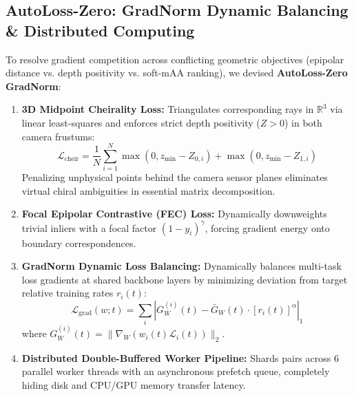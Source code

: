 \documentclass[10pt,twocolumn,letterpaper]{article}
\begin{document}
\subsection{AutoLoss-Zero: GradNorm Dynamic Balancing \& Distributed Computing}
To resolve gradient competition across conflicting geometric objectives (epipolar distance vs. depth positivity vs. soft-mAA ranking), we devised \textbf{AutoLoss-Zero GradNorm}:
\begin{enumerate}
    \item \textbf{3D Midpoint Cheirality Loss:} Triangulates corresponding rays in $\mathbb{R}^3$ via linear least-squares and enforces strict depth positivity ($Z > 0$) in both camera frustums:
    \begin{equation}
        \mathcal{L}_{\text{cheir}} = \frac{1}{N} \sum_{i=1}^N \max(0, z_{\min} - Z_{0, i}) + \max(0, z_{\min} - Z_{1, i})
    \end{equation}
    Penalizing unphysical points behind the camera sensor planes eliminates virtual chiral ambiguities in essential matrix decomposition.
    \item \textbf{Focal Epipolar Contrastive (FEC) Loss:} Dynamically downweights trivial inliers with a focal factor $(1 - y_i)^\gamma$, forcing gradient energy onto boundary correspondences.
    \item \textbf{GradNorm Dynamic Loss Balancing:} Dynamically balances multi-task loss gradients at shared backbone layers by minimizing deviation from target relative training rates $r_i(t)$:
    \begin{equation}
        \mathcal{L}_{\text{grad}}(w; t) = \sum_{i} \left| G_W^{(i)}(t) - \bar{G}_W(t) \cdot [r_i(t)]^\alpha \right|_1
    \end{equation}
    where $G_W^{(i)}(t) = \|\nabla_W (w_i(t) \mathcal{L}_i(t))\|_2$.
    \item \textbf{Distributed Double-Buffered Worker Pipeline:} Shards pairs across 6 parallel worker threads with an asynchronous prefetch queue, completely hiding disk and CPU/GPU memory transfer latency.
\end{enumerate}
\end{document}

